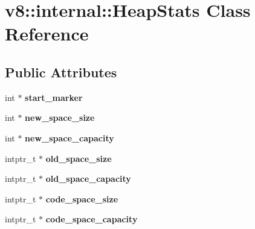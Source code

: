 \hypertarget{classv8_1_1internal_1_1_heap_stats}{}\section{v8\+:\+:internal\+:\+:Heap\+Stats Class Reference}
\label{classv8_1_1internal_1_1_heap_stats}
\subsection*{Public Attributes}
\begin{DoxyCompactItemize}
\item 
int $\ast$ {\bfseries start\+\_\+marker}\hypertarget{classv8_1_1internal_1_1_heap_stats_a1998bb2460c951bcf71995671078da17}{}\label{classv8_1_1internal_1_1_heap_stats_a1998bb2460c951bcf71995671078da17}

\item 
int $\ast$ {\bfseries new\+\_\+space\+\_\+size}\hypertarget{classv8_1_1internal_1_1_heap_stats_ac399ed971be498880eec7386980b4881}{}\label{classv8_1_1internal_1_1_heap_stats_ac399ed971be498880eec7386980b4881}

\item 
int $\ast$ {\bfseries new\+\_\+space\+\_\+capacity}\hypertarget{classv8_1_1internal_1_1_heap_stats_ab41654f198741bd084ed450ac0dde603}{}\label{classv8_1_1internal_1_1_heap_stats_ab41654f198741bd084ed450ac0dde603}

\item 
intptr\+\_\+t $\ast$ {\bfseries old\+\_\+space\+\_\+size}\hypertarget{classv8_1_1internal_1_1_heap_stats_a8d751bb1548f60a96c05ff7281958840}{}\label{classv8_1_1internal_1_1_heap_stats_a8d751bb1548f60a96c05ff7281958840}

\item 
intptr\+\_\+t $\ast$ {\bfseries old\+\_\+space\+\_\+capacity}\hypertarget{classv8_1_1internal_1_1_heap_stats_af7cdf17cb2e36114e0906262fb4fcf1b}{}\label{classv8_1_1internal_1_1_heap_stats_af7cdf17cb2e36114e0906262fb4fcf1b}

\item 
intptr\+\_\+t $\ast$ {\bfseries code\+\_\+space\+\_\+size}\hypertarget{classv8_1_1internal_1_1_heap_stats_a01040c93d237d0e4ec78579df24c9f3b}{}\label{classv8_1_1internal_1_1_heap_stats_a01040c93d237d0e4ec78579df24c9f3b}

\item 
intptr\+\_\+t $\ast$ {\bfseries code\+\_\+space\+\_\+capacity}\hypertarget{classv8_1_1internal_1_1_heap_stats_a2a5872a10dfc22ed0e56207f99e1a125}{}\label{classv8_1_1internal_1_1_heap_stats_a2a5872a10dfc22ed0e56207f99e1a125}


\end{DoxyCompactItemize}
